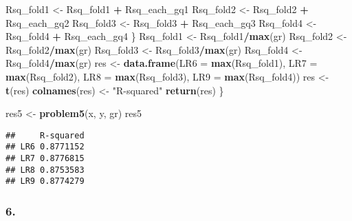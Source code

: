 \documentclass[
]{article}
\newenvironment{Shaded}{\begin{snugshade}}{\end{snugshade}}
\newcommand{\AttributeTok}[1]{\textcolor[rgb]{0.13,0.29,0.53}{#1}}
\newcommand{\FunctionTok}[1]{\textcolor[rgb]{0.13,0.29,0.53}{\textbf{#1}}}
\newcommand{\NormalTok}[1]{#1}
\newcommand{\OtherTok}[1]{\textcolor[rgb]{0.56,0.35,0.01}{#1}}
\newcommand{\SpecialCharTok}[1]{\textcolor[rgb]{0.81,0.36,0.00}{\textbf{#1}}}
\newcommand{\StringTok}[1]{\textcolor[rgb]{0.31,0.60,0.02}{#1}}
\begin{document}
\begin{Shaded}
\begin{Highlighting}[]
\NormalTok{    Rsq\_fold1 }\OtherTok{\textless{}{-}}\NormalTok{ Rsq\_fold1 }\SpecialCharTok{+}\NormalTok{ Rsq\_each\_gq1}
\NormalTok{    Rsq\_fold2 }\OtherTok{\textless{}{-}}\NormalTok{ Rsq\_fold2 }\SpecialCharTok{+}\NormalTok{ Rsq\_each\_gq2}
\NormalTok{    Rsq\_fold3 }\OtherTok{\textless{}{-}}\NormalTok{ Rsq\_fold3 }\SpecialCharTok{+}\NormalTok{ Rsq\_each\_gq3}
\NormalTok{    Rsq\_fold4 }\OtherTok{\textless{}{-}}\NormalTok{ Rsq\_fold4 }\SpecialCharTok{+}\NormalTok{ Rsq\_each\_gq4}
\NormalTok{  \}}
\NormalTok{  Rsq\_fold1 }\OtherTok{\textless{}{-}}\NormalTok{ Rsq\_fold1}\SpecialCharTok{/}\FunctionTok{max}\NormalTok{(gr)}
\NormalTok{  Rsq\_fold2 }\OtherTok{\textless{}{-}}\NormalTok{ Rsq\_fold2}\SpecialCharTok{/}\FunctionTok{max}\NormalTok{(gr)}
\NormalTok{  Rsq\_fold3 }\OtherTok{\textless{}{-}}\NormalTok{ Rsq\_fold3}\SpecialCharTok{/}\FunctionTok{max}\NormalTok{(gr)}
\NormalTok{  Rsq\_fold4 }\OtherTok{\textless{}{-}}\NormalTok{ Rsq\_fold4}\SpecialCharTok{/}\FunctionTok{max}\NormalTok{(gr)}
\NormalTok{  res }\OtherTok{\textless{}{-}} \FunctionTok{data.frame}\NormalTok{(}\AttributeTok{LR6 =} \FunctionTok{max}\NormalTok{(Rsq\_fold1),}
                    \AttributeTok{LR7 =} \FunctionTok{max}\NormalTok{(Rsq\_fold2),}
                    \AttributeTok{LR8 =} \FunctionTok{max}\NormalTok{(Rsq\_fold3),}
                    \AttributeTok{LR9 =} \FunctionTok{max}\NormalTok{(Rsq\_fold4))}
\NormalTok{  res }\OtherTok{\textless{}{-}} \FunctionTok{t}\NormalTok{(res)}
  \FunctionTok{colnames}\NormalTok{(res) }\OtherTok{\textless{}{-}} \StringTok{"R{-}squared"}
  \FunctionTok{return}\NormalTok{(res)}
\NormalTok{\}}

\NormalTok{res5 }\OtherTok{\textless{}{-}} \FunctionTok{problem5}\NormalTok{(x, y, gr)}
\NormalTok{res5}
\end{Highlighting}
\end{Shaded}

\begin{verbatim}
##     R-squared
## LR6 0.8771152
## LR7 0.8776815
## LR8 0.8753583
## LR9 0.8774279
\end{verbatim}

\subsubsection{6.}\label{section-5}
\end{document}
